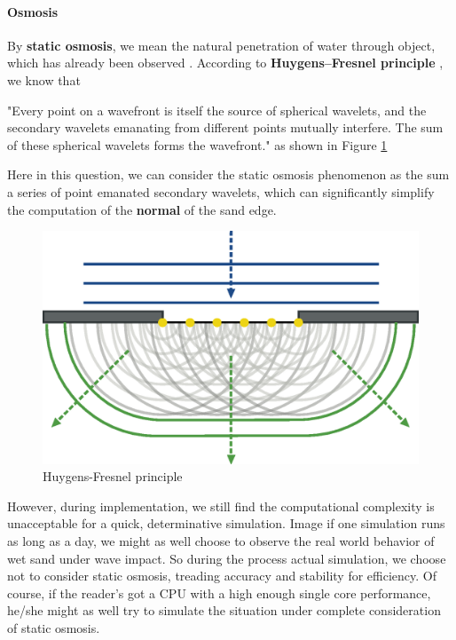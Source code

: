 \documentclass[12pt]{article}
\begin{document}
\paragraph{Osmosis}
By \textbf{static osmosis}, we mean the natural penetration of water through object, which has already been observed \autocite{pakpour2012construct}. According to \textbf{Huygens–Fresnel principle} \autocite{huygensfresnel}, we know that
\par
"Every point on a wavefront is itself the source of spherical wavelets, and the secondary wavelets emanating from different points mutually interfere. The sum of these spherical wavelets forms the wavefront." as shown in Figure \ref{fig:huygens}
\par
Here in this question, we can consider the static osmosis phenomenon as the sum a series of point emanated secondary wavelets, which can significantly simplify the computation of the \textbf{normal} of the sand edge.
\begin{figure}[H]
    \centering
    \includegraphics[width=0.5\linewidth]{Refraction_on_an_aperture_-_Huygens-Fresnel_principle.eps}
    \caption{Huygens-Fresnel principle}
    \label{fig:huygens}
\end{figure}
\par
However, during implementation, we still find the computational complexity is unacceptable for a quick, determinative simulation. Image if one simulation runs as long as a day, we might as well choose to observe the real world behavior of wet sand under wave impact. So during the process actual simulation, we choose not to consider static osmosis, treading accuracy and stability for efficiency. Of course, if the reader's got a CPU with a high enough single core performance, he/she might as well try to simulate the situation under complete consideration of static osmosis.
\end{document}
